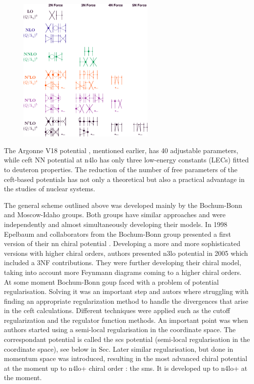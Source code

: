 \begin{figure}[h]
    \begin{center}
    \includegraphics[width=0.6\textwidth]{Figures/chiral.png}
    \end{center}
    \caption{}
    \label{chiral_diagrams}
\end{figure}

The Argonne V18 potential \cite{AV18Wiringa}, mentioned earlier, has 40 adjustable parameters,
while \gls{ceft} NN potential at \gls{n4lo} \cite{Machleidt2011} has only three low-energy constants (LECs) fitted to deuteron properties.
The reduction of the number of free parameters of the \gls{ceft}-based potentials
has not only a theoretical but also a practical advantage in the studies of nuclear systems.

The general scheme outlined above was developed mainly by the Bochum-Bonn and Moscow-Idaho groups.
Both groups have similar approaches and were independently and almost simultaneously
developing their models. In 1998 Epelbaum and collaborators from the Bochum-Bonn group 
presented a first version of their \gls{nn} chiral potential \cite{EPELBAOUM1998107, epelbaum2000two}.
Developing a more and more sophisticated versions with higher chiral orders, authors presented
\gls{n3lo} potential in 2005 \cite{epelbaum2005two} which included a 3NF contributions.
They were further developing their chiral model, taking into account more Feynmann diagrams
coming to a higher chiral orders.
At some moment Bochum-Bonn goup faced with a problem of potential regularisation\cite{skibinski_3H, Witala_2014}.
Solving it was an important step and autors
where struggling with finding an appropriate
regularization method to handle the divergences that arise in the \gls{ceft} calculations.
Different techniques were applied such as the cutoff regularization and the regulator function methods.
An important point was when authors started using a semi-local regularisation 
in the coordinate space. The correspondant potential is called  the \gls{scs} potential
(semi-local regularisation in the coordinate space)\cite{Epelbaum2014SCS}, see below in Sec{}.
Later similar regularisation,
but done in momentum space was introduced, resulting in the most advanced chiral potential at the moment up to  
\gls{n4lo+} chiral order \cite{reinkrebs2018}: the \gls{sms}. It is developed up to \gls{n4lo+} at the moment.

